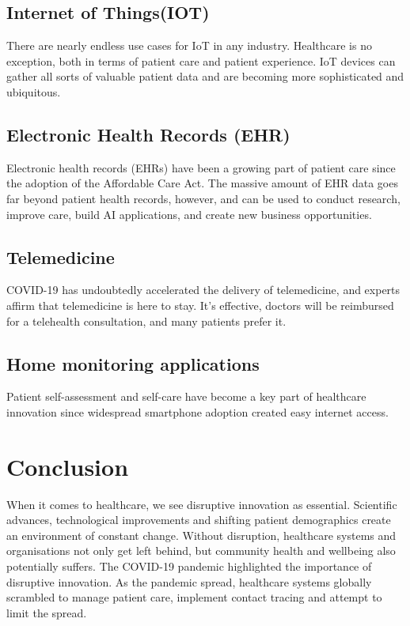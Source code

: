 \documentclass[12pt]{article}
\begin{document}
\subsection{Internet of Things(IOT)}
There are nearly endless use cases for IoT in any industry. Healthcare is no exception, both in terms of patient care and patient experience.
IoT devices can gather all sorts of valuable patient data and are becoming more sophisticated and ubiquitous.
\subsection{Electronic Health Records (EHR)}
Electronic health records (EHRs) have been a growing part of patient care since the adoption of the Affordable Care Act. The massive amount of EHR data goes far beyond patient health records, however, and can be used to conduct research, improve care, build AI applications, and create new business opportunities. 
\subsection{Telemedicine}
COVID-19 has undoubtedly accelerated the delivery of telemedicine, and experts affirm that telemedicine is here to stay. It’s effective, doctors will be reimbursed for a telehealth consultation, and many patients prefer it. 
\subsection{Home monitoring applications}
Patient self-assessment and self-care have become a key part of healthcare innovation since widespread smartphone adoption created easy internet access.
\section{Conclusion}
When it comes to healthcare, we see disruptive innovation as essential. Scientific advances, technological improvements and shifting patient demographics create an environment of constant change. Without disruption, healthcare systems and organisations not only get left behind, but community health and wellbeing also potentially suffers. \newline
The COVID-19 pandemic highlighted the importance of disruptive innovation. As the pandemic spread, healthcare systems globally scrambled to manage patient care, implement contact tracing and attempt to limit the spread. 
\end{document}
